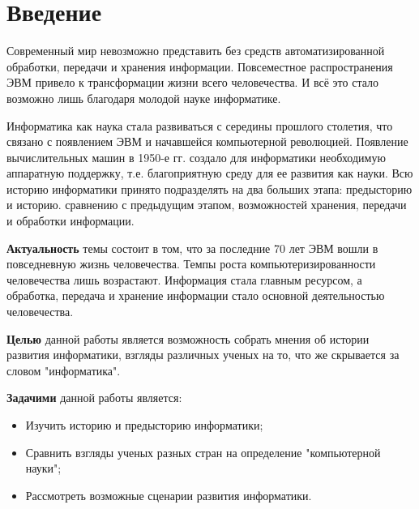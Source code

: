 \chapter*{Введение}							%


Современный мир невозможно представить без средств автоматизированной обработки, передачи и хранения информации. Повсеместное распространения ЭВМ привело к трансформации жизни всего человечества. И всё это стало возможно лишь благодаря молодой науке информатике.

Информатика как наука стала развиваться с середины прошлого столетия, что связано с появлением ЭВМ и начавшейся компьютерной революцией. Появление вычислительных машин в 1950-е гг. создало для информатики необходимую аппаратную поддержку, т.е. благоприятную среду для ее развития как науки. Всю историю информатики принято подразделять на два больших этапа: предысторию и историю.
 сравнению с предыдущим этапом, возможностей хранения, передачи и обработки информации.

\textbf{Актуальность} темы состоит в том, что за последние 70 лет ЭВМ вошли  в повседневную жизнь человечества. Темпы роста компьютеризированности человечества лишь возрастают. Информация стала главным ресурсом, а обработка, передача и хранение информации стало основной деятельностью человечества.  

\textbf{Целью} данной работы является возможность собрать мнения об истории развития информатики, взгляды различных ученых на то, что же скрывается за словом "информатика".

\textbf{Задачими} данной работы является:
\begin{itemize}
\item Изучить историю и предысторию информатики;
\item Сравнить взгляды ученых разных стран на определение "компьютерной науки";
\item Рассмотреть возможные сценарии развития информатики.
\end{itemize}

\clearpage